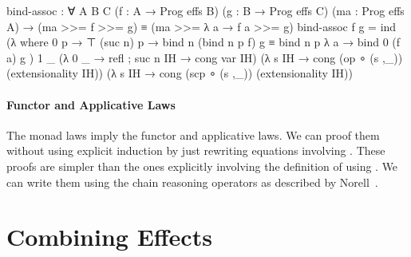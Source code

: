 \begin{code}
bind-assoc : ∀ {A B C}
  (f : A → Prog effs B) (g : B → Prog effs C) (ma : Prog effs A) →
  (ma >>= f >>= g) ≡ (ma >>= λ a → f a >>= g)
bind-assoc f g = ind
  (λ where
    0 p        → ⊤
    (suc n) p  → bind n (bind n p f) g ≡ bind n p λ a → bind 0 (f a) g
  ) 1 _
  (λ{ {0} _ → refl ; {suc n} IH → cong var IH})
  (λ s IH → cong (op   ∘ (s ,_)) (extensionality IH))
  (λ s IH → cong (scp  ∘ (s ,_)) (extensionality IH))
\end{code}

\paragraph{Functor and Applicative Laws}
The monad laws imply the functor and applicative laws.
We can proof them without using explicit induction by just rewriting equations
involving \AgdaFunction{>>=}.
These proofs are simpler than the ones explicitly involving the definition of
\AgdaFunction{>>=} using .
We can write them using the chain reasoning operators as described by
Norell~\cite{norell:thesis}.



\section{Combining Effects}


